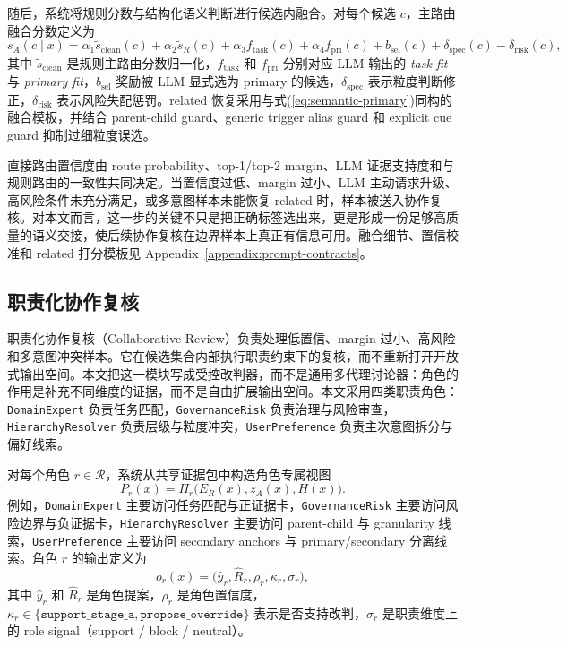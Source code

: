\documentclass[11pt,a4paper]{ctexart}
\begin{document}
随后，系统将规则分数与结构化语义判断进行候选内融合。对每个候选 $c$，主路由融合分数定义为
\begin{equation}
\label{eq:semantic-primary}
s_A(c\mid x)=
\alpha_1 \widetilde s_{\mathrm{clean}}(c)
+ \alpha_2 \widetilde s_R(c)
+ \alpha_3 f_{\mathrm{task}}(c)
+ \alpha_4 f_{\mathrm{pri}}(c)
+ b_{\mathrm{sel}}(c)
+ \delta_{\mathrm{spec}}(c)
- \delta_{\mathrm{risk}}(c),
\end{equation}
其中 $\widetilde s_{\mathrm{clean}}$ 是规则主路由分数归一化，$f_{\mathrm{task}}$ 和 $f_{\mathrm{pri}}$ 分别对应 LLM 输出的 \emph{task fit} 与 \emph{primary fit}，$b_{\mathrm{sel}}$ 奖励被 LLM 显式选为 primary 的候选，$\delta_{\mathrm{spec}}$ 表示粒度判断修正，$\delta_{\mathrm{risk}}$ 表示风险失配惩罚。related 恢复采用与式(\ref{eq:semantic-primary})同构的融合模板，并结合 parent-child guard、generic trigger alias guard 和 explicit cue guard 抑制过细粒度误选。

直接路由置信度由 route probability、top-1/top-2 margin、LLM 证据支持度和与规则路由的一致性共同决定。当置信度过低、margin 过小、LLM 主动请求升级、高风险条件未充分满足，或多意图样本未能恢复 related 时，样本被送入协作复核。对本文而言，这一步的关键不只是把正确标签选出来，更是形成一份足够高质量的语义交接，使后续协作复核在边界样本上真正有信息可用。融合细节、置信校准和 related 打分模板见 Appendix~\ref{appendix:prompt-contracts}。

\subsection{职责化协作复核}

职责化协作复核（Collaborative Review）负责处理低置信、margin 过小、高风险和多意图冲突样本。它在候选集合内部执行职责约束下的复核，而不重新打开开放式输出空间。本文把这一模块写成受控改判器，而不是通用多代理讨论器：角色的作用是补充不同维度的证据，而不是自由扩展输出空间。本文采用四类职责角色：\texttt{DomainExpert} 负责任务匹配，\texttt{GovernanceRisk} 负责治理与风险审查，\texttt{HierarchyResolver} 负责层级与粒度冲突，\texttt{UserPreference} 负责主次意图拆分与偏好线索。

对每个角色 $r\in\mathcal R$，系统从共享证据包中构造角色专属视图
\begin{equation}
P_r(x)=\Pi_r\bigl(E_R(x),z_A(x),H(x)\bigr).
\end{equation}
例如，\texttt{DomainExpert} 主要访问任务匹配与正证据卡，\texttt{GovernanceRisk} 主要访问风险边界与负证据卡，\texttt{HierarchyResolver} 主要访问 parent-child 与 granularity 线索，\texttt{UserPreference} 主要访问 secondary anchors 与 primary/secondary 分离线索。角色 $r$ 的输出定义为
\begin{equation}
o_r(x)=\bigl(\hat y_r,\hat R_r,\rho_r,\kappa_r,\sigma_r\bigr),
\end{equation}
其中 $\hat y_r$ 和 $\hat R_r$ 是角色提案，$\rho_r$ 是角色置信度，$\kappa_r\in\{\texttt{support\_stage\_a},\texttt{propose\_override}\}$ 表示是否支持改判，$\sigma_r$ 是职责维度上的 role signal（support / block / neutral）。
\end{document}
